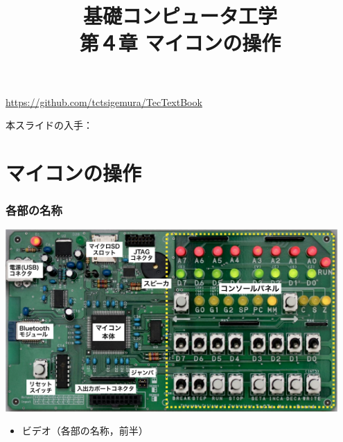 \documentclass[handout]{beamer}         %
\begin{document}
\title{基礎コンピュータ工学\\第４章 マイコンの操作}
\date{}

\begin{frame}
  \titlepage
  \centerline{\url{https://github.com/tctsigemura/TecTextBook}}
  \vfill
  \centerline{本スライドの入手：
    }
\end{frame}


\section{マイコンの操作}
\begin{frame}
  \frametitle{各部の名称}
  \vfill
  \centerline{
    \includegraphics[width=0.95\textwidth]{../Keynote/kakubu-crop.pdf}}
  \vfill
  \begin{itemize}
    \item ビデオ（各部の名称，前半）
  \end{itemize}
  \vfill
\end{frame}
\end{document}
